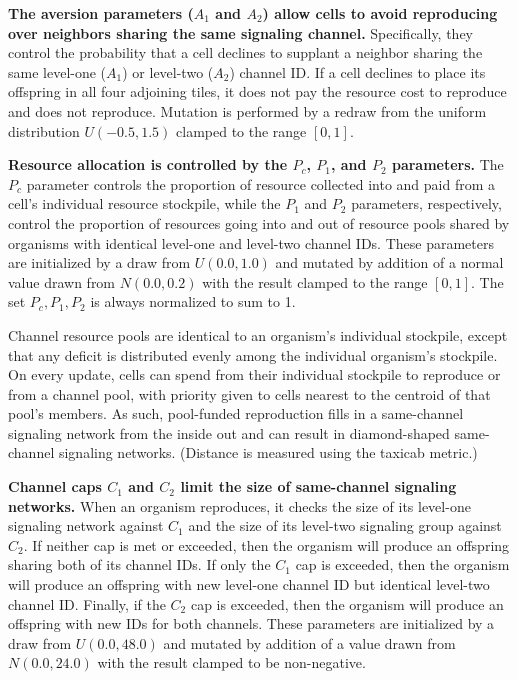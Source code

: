 \textbf{
The aversion parameters ($A_1$ and $A_2$) allow cells to avoid reproducing over neighbors sharing the same signaling channel.
}
Specifically, they control the probability that a cell declines to supplant a neighbor sharing the same level-one ($A_1$) or level-two ($A_2$) channel ID.
If a cell declines to place its offspring in all four adjoining tiles, it does not pay the resource cost to reproduce and does not reproduce.
Mutation is performed by a redraw from the uniform distribution $U(-0.5,1.5)$ clamped to the range $[0,1]$.

\textbf{
Resource allocation is controlled by the $P_{c}$, $P_1$, and $P_2$ parameters.
}
The $P_{c}$ parameter controls the proportion of resource collected into and paid from a cell's individual resource stockpile, while the $P_1$ and $P_2$ parameters, respectively, control the proportion of resources going into and out of resource pools shared by organisms with identical level-one and level-two channel IDs.
These parameters are initialized by a draw from $U(0.0, 1.0)$ and mutated by addition of a normal value drawn from $N(0.0,0.2)$ with the result clamped to the range $[0,1]$.
The set $P_{c}, P_1, P_2$ is always normalized to sum to 1.

Channel resource pools are identical to an organism's individual stockpile, except that any deficit is distributed evenly among the individual organism's stockpile.
On every update, cells can spend from their individual stockpile to reproduce or from a channel pool, with priority given to cells nearest to the centroid of that pool's members.
As such, pool-funded reproduction fills in a same-channel signaling network from the inside out and can result in diamond-shaped same-channel signaling networks.
(Distance is measured using the taxicab metric.)

\textbf{
Channel caps $C_1$ and $C_2$ limit the size of same-channel signaling networks.
}
When an organism reproduces, it checks the size of its level-one signaling network against $C_1$ and the size of its level-two signaling group against $C_2$.
If neither cap is met or exceeded, then the organism will produce an offspring sharing both of its channel IDs.
If only the $C_1$ cap is exceeded, then the organism will produce an offspring with new level-one channel ID but identical level-two channel ID.
Finally, if the $C_2$ cap is exceeded, then the organism will produce an offspring with new IDs for both channels.
These parameters are initialized by a draw from $U(0.0, 48.0)$ and mutated by addition of a value drawn from $N(0.0,24.0)$ with the result clamped to be non-negative.

